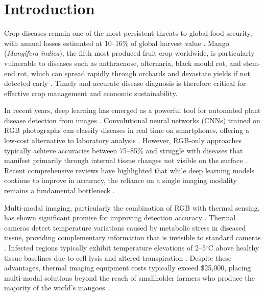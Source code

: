\documentclass[utf8]{FrontiersinHarvard}
\newenvironment{revblock}{}{}
\begin{document}
\section{Introduction}
\begin{revblock}
Crop diseases remain one of the most persistent threats to global food security, with annual losses estimated at 10--16\% of global harvest value \cite{fao2021,fao2023,savary2019}. Mango (\textit{Mangifera indica}), the fifth most produced fruit crop worldwide, is particularly vulnerable to diseases such as anthracnose, alternaria, black mould rot, and stem-end rot, which can spread rapidly through orchards and devastate yields if not detected early \cite{singh2019}. Timely and accurate disease diagnosis is therefore critical for effective crop management and economic sustainability.

In recent years, deep learning has emerged as a powerful tool for automated plant disease detection from images \cite{mohanty2016,ferentinos2018,thakur2022}. Convolutional neural networks (CNNs) trained on RGB photographs can classify diseases in real time on smartphones, offering a low-cost alternative to laboratory analysis \cite{kamilaris2018,coulibaly2022}. However, RGB-only approaches typically achieve accuracies between 75--85\% and struggle with diseases that manifest primarily through internal tissue changes not visible on the surface \cite{pineda2021,abade2021}. Recent comprehensive reviews have highlighted that while deep learning models continue to improve in accuracy, the reliance on a single imaging modality remains a fundamental bottleneck \cite{thakur2022,hasan2024}.

Multi-modal imaging, particularly the combination of RGB with thermal sensing, has shown significant promise for improving detection accuracy \cite{khanal2017,maimaitijiang2020}. Thermal cameras detect temperature variations caused by metabolic stress in diseased tissue, providing complementary information that is invisible to standard cameras \cite{mahlein2016,pineda2021}. Infected regions typically exhibit temperature elevations of 2--5$^{\circ}$C above healthy tissue baselines due to cell lysis and altered transpiration \cite{mahlein2016}. Despite these advantages, thermal imaging equipment costs typically exceed \$25,000, placing multi-modal solutions beyond the reach of smallholder farmers who produce the majority of the world's mangoes \cite{sishodia2020}.


\end{revblock}
\end{document}

